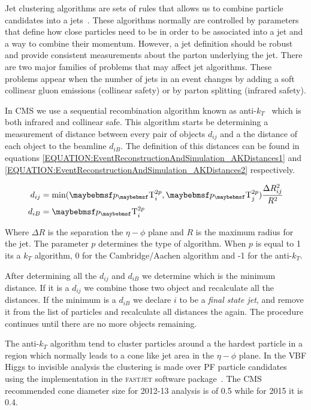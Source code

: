 
Jet clustering algorithms are sets of rules that allows us to combine particle candidates into a jets~\cite{ARTICLE:TowardsJetography}. These algorithms normally are controlled by parameters that define how close particles need to be in order to be associated into a jet and a way to combine their momentum. However, a jet definition should be robust and provide consistent measurements about the parton underlying the jet. There are two major families of problems that may affect jet algorithms. These problems appear when the number of jets in an event changes by adding a soft collinear gluon emissions (collinear safety) or by parton splitting (infrared safety). 

In \gls{CMS} we use a sequential recombination algorithm known as anti-$k_T$~\cite{ARTICLE:AntiKtAlgorithm} which is both infrared and collinear safe. This algorithm starts be determining a measurement of distance between every pair of objects $d_{ij}$ and a the distance of each object to the beamline $d_{iB}$. The definition of this distances can be found in equations \ref{EQUATION:EventReconstructionAndSimulation_AKDistances1} and \ref{EQUATION:EventReconstructionAndSimulation_AKDistances2} respectively. 

\begin{align}
d_{ij} &= \text{min}({\pT}_{i}^{2p},{\pT}_{j}^{2p})\frac{\Delta R_{ij}^{2}}{R^{2}} \label{EQUATION:EventReconstructionAndSimulation_AKDistances1} \\
d_{iB} &= {\pT}_{i}^{2p}\ \label{EQUATION:EventReconstructionAndSimulation_AKDistances2} 
\end{align}

Where $\Delta R$ is the separation the $\eta-\phi$ plane and $R$ is the maximum radius for the jet. The parameter $p$ determines the type of algorithm. When $p$ is equal to 1 its a $k_T$ algorithm, 0 for the Cambridge/Aachen algorithm and -1 for the anti-$k_T$. 

After determining all the $d_{ij}$ and $d_{iB}$ we determine which is the minimum distance. If it is a $d_{ij}$ we combine those two object and recalculate all the distances. If the minimum is a $d_{iB}$ we declare $i$ to be a \textit{final state jet}, and remove it from the list of particles and recalculate all distances the again. The procedure continues until there are no more objects remaining.

The anti-$k_T$ algorithm tend to cluster particles around a the hardest particle in a region which normally leads to a cone like jet area in the $\eta-\phi$ plane. In the \gls{VBF} Higgs to invisible analysis the clustering is made over \gls{PF} particle candidates using the implementation in the \textsc{fastjet} software package~\cite{ARTICLE:FastJetUserManual}. The \gls{CMS} recommended cone diameter size for 2012-13 analysis is of 0.5 while for 2015 it is 0.4.

